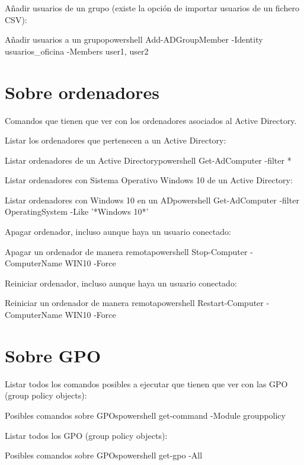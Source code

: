 Añadir usuarios de un grupo (existe la opción de importar usuarios de un fichero CSV):
\begin{mycode}{Añadir usuarios a un grupo}{powershell}{}
Add-ADGroupMember -Identity usuarios_oficina -Members user1, user2
\end{mycode}


\section{Sobre ordenadores}
Comandos que tienen que ver con los ordenadores asociados al Active Directory.

Listar los ordenadores que pertenecen a un Active Directory:
\begin{mycode}{Listar ordenadores de un Active Directory}{powershell}{}
Get-AdComputer -filter *
\end{mycode}


Listar ordenadores con Sistema Operativo Windows 10 de un Active Directory:
\begin{mycode}{Listar ordenadores con Windows 10 en un AD}{powershell}{}
Get-AdComputer -filter  {OperatingSystem -Like '*Windows 10*'}
\end{mycode}


Apagar ordenador, incluso aunque haya un usuario conectado:
\begin{mycode}{Apagar un ordenador de manera remota}{powershell}{}
Stop-Computer -ComputerName WIN10 -Force
\end{mycode}

Reiniciar ordenador, incluso aunque haya un usuario conectado:
\begin{mycode}{Reiniciar un ordenador de manera remota}{powershell}{}
Restart-Computer -ComputerName WIN10 -Force
\end{mycode}

\section{Sobre GPO}
Listar todos los comandos posibles a ejecutar que tienen que ver con las GPO (group policy objects):
\begin{mycode}{Posibles comandos sobre GPOs}{powershell}{}
get-command -Module grouppolicy
\end{mycode}


Listar todos los GPO (group policy objects):
\begin{mycode}{Posibles comandos sobre GPOs}{powershell}{}
get-gpo -All
\end{mycode}


